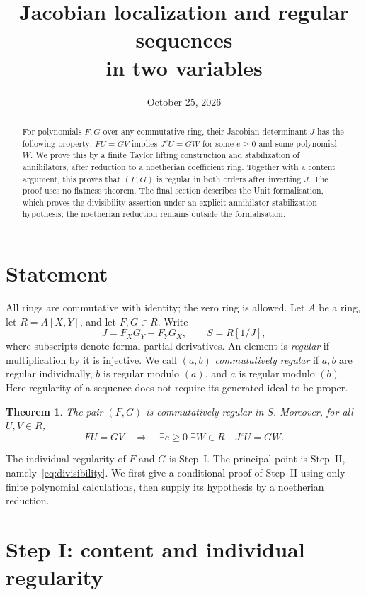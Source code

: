 \documentclass[11pt]{amsart}
\title[Jacobian localization and regular sequences]{Jacobian localization and regular sequences\\in two variables}
\date{October 25, 2026}
\newtheorem{theorem}{Theorem}[section]
\theoremstyle{definition}
\theoremstyle{remark}
\begin{document}
\begin{abstract}
For polynomials $F,G$ over any commutative ring, their Jacobian
determinant $J$ has the following property: $FU=GV$ implies
$J^eU=GW$ for some $e\geq0$ and some polynomial $W$.
We prove this by a finite Taylor lifting construction and stabilization
of annihilators, after reduction to a noetherian coefficient ring.
Together with a content argument, this proves that $(F,G)$ is regular
in both orders after inverting $J$. The proof uses no flatness theorem.
The final section describes the Unit formalisation, which proves the
divisibility assertion under an explicit annihilator-stabilization
hypothesis; the noetherian reduction remains outside the formalisation.
\end{abstract}
\maketitle

\section{Statement}

All rings are commutative with identity; the zero ring is allowed.
Let $A$ be a ring, let $R=A[X,Y]$, and let $F,G\in R$. Write
\[
 J=F_XG_Y-F_YG_X,\qquad S=R[1/J],
\]
where subscripts denote formal partial derivatives.
An element is \emph{regular} if multiplication by it is injective.
We call $(a,b)$ \emph{commutatively regular} if $a,b$ are regular
individually, $b$ is regular modulo $(a)$, and $a$ is regular modulo
$(b)$. Here regularity of a sequence does not require its generated
ideal to be proper.

\begin{theorem}\label{thm:main}
The pair $(F,G)$ is commutatively regular in $S$.
Moreover, for all $U,V\in R$,
\begin{equation}\label{eq:divisibility}
 FU=GV\quad\Longrightarrow\quad
 \exists e\geq0\;\exists W\in R\quad J^eU=GW.
\end{equation}
\end{theorem}

The individual regularity of $F$ and $G$ is Step~I. The principal
point is Step~II, namely~\eqref{eq:divisibility}. We first give a
conditional proof of Step~II using only finite polynomial calculations,
then supply its hypothesis by a noetherian reduction.

\section{Step I: content and individual regularity}\label{sec:content}
\end{document}
